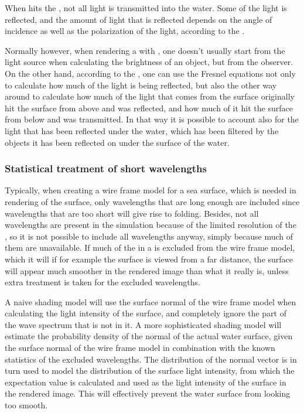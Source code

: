 When \light hits the , not all light is transmitted into the water. Some of the light is reflected, and the amount of light that is reflected depends on the angle of incidence as well as the polarization of the light, according to the .

Normally however, when rendering a \scene with , one doesn't usually start from the light source when calculating the brightness of an object, but from the observer. On the other hand, according to the , one can use the Fresnel equations not only to calculate how much of the light is being reflected, but also the other way around to calculate how much of the light that comes from the surface originally hit the surface from above and was reflected, and how much of it hit the surface from below and was transmitted. In that way it is possible to account also for the light that has been reflected under the water, which has been filtered by the objects it has been reflected on under the surface of the water.

\subsubsection{Statistical treatment of short wavelengths}

Typically, when creating a wire frame model for a sea surface, which is needed in rendering of the surface, only wavelengths that are long enough are included since wavelengths that are too short will give rise to folding. Besides, not all wavelengths are present in the simulation because of the limited resolution of the \grid, so it is not possible to include all wavelengths anyway, simply because much of them are unavailable. If much of the  in a  is excluded from the wire frame model, which it will if for example the surface is viewed from a far distance, the surface will appear much smoother in the rendered image than what it really is, unless extra treatment is taken for the excluded wavelengths.

A naive shading model will use the surface normal of the wire frame model when calculating the light intensity of the surface, and completely ignore the part of the wave spectrum that is not in it. A more sophisticated shading model will estimate the probability density of the normal of the actual water surface, given the surface normal of the wire frame model in combination with the known statistics of the excluded wavelengths. The distribution of the normal vector is in turn used to model the distribution of the surface light intensity, from which the expectation value is calculated and used as the light intensity of the surface in the rendered image. This will effectively prevent the water surface from looking too smooth.

